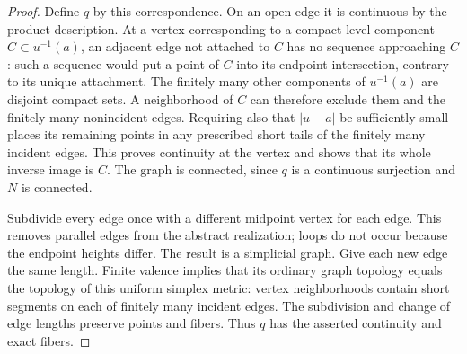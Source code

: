\documentclass[11pt]{article}
\numberwithin{equation}{section}
\theoremstyle{definition}
\theoremstyle{remark}
\begin{document}
\begin{proof}
Define $q$ by this correspondence.  On an open edge it is continuous
by the product description.  At a vertex corresponding to a compact
level component $C\subset u^{-1}(a)$, an adjacent edge not attached
to $C$ has no sequence approaching $C$: such a sequence would put
a point of $C$ into its endpoint intersection, contrary to its unique
attachment.  The finitely many other components of $u^{-1}(a)$ are
disjoint compact sets.  A neighborhood of $C$ can therefore exclude
them and the finitely many nonincident edges.  Requiring also that
$|u-a|$ be sufficiently small places its remaining points in any
prescribed short tails of the finitely many incident edges.  This
proves continuity at the vertex and shows that its whole inverse
image is $C$. The graph is connected, since $q$ is a continuous
surjection and $N$ is connected.

Subdivide every edge once with a different midpoint vertex for each
edge.  This removes parallel edges from the abstract realization;
loops do not occur because the endpoint heights differ.  The result
is a simplicial graph.  Give each new edge the same length.  Finite
valence implies that its ordinary graph topology equals the topology
of this uniform simplex metric: vertex neighborhoods contain short
segments on each of finitely many incident edges.  The subdivision
and change of edge lengths preserve points and fibers.  Thus $q$
has the asserted continuity and exact fibers.
\end{proof}
\end{document}
